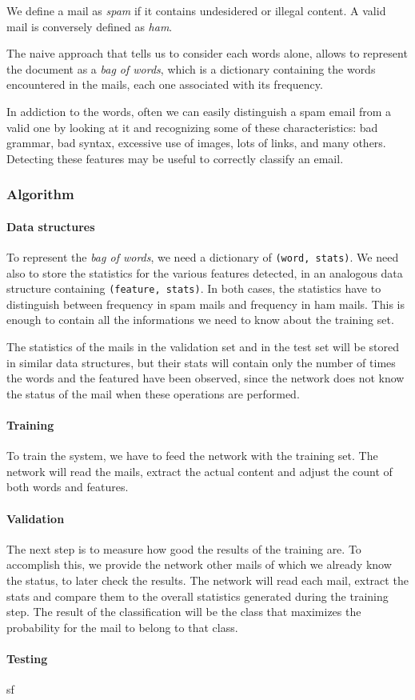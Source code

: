 We define a mail as \textit{spam} if it contains undesidered or illegal content. A valid mail is conversely defined as \textit{ham}.

The naive approach that tells us to consider each words alone, allows to represent the document as a \textit{bag of words}, which is a dictionary containing the words encountered in the mails, each one associated with its frequency.

In addiction to the words, often we can easily distinguish a spam email from a valid one by looking at it and recognizing some of these characteristics: bad grammar, bad syntax, excessive use of images, lots of links, and many others. Detecting these features may be useful to correctly classify an email.

\subsubsection{Algorithm}
\paragraph{Data structures}
To represent the \textit{bag of words}, we need a dictionary of \verb!(word, stats)!. We need also to store the statistics for the various features detected, in an analogous data structure containing \verb!(feature, stats)!. In both cases, the statistics have to distinguish between frequency in spam mails and frequency in ham mails. This is enough to contain all the informations we need to know about the training set.

The statistics of the mails in the validation set and in the test set will be stored in similar data structures, but their stats will contain only the number of times the words and the featured have been observed, since the network does not know the status of the mail when these operations are performed.

\paragraph{Training}
To train the system, we have to feed the network with the training set. The network will read the mails, extract the actual content and adjust the count of both words and features.

\paragraph{Validation}
The next step is to measure how good the results of the training are. To accomplish this, we provide the network other mails of which we already know the status, to later check the results. The network will read each mail, extract the stats and compare them to the overall statistics generated during the training step. The result of the classification will be the class that maximizes the probability for the mail to belong to that class.

\paragraph{Testing}
sf
